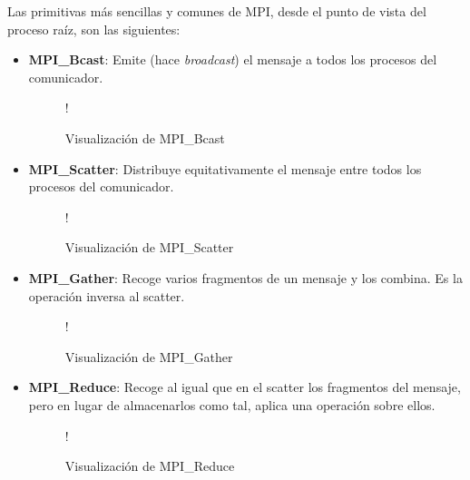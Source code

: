 Las primitivas más sencillas y comunes de MPI, desde el punto de vista del proceso raíz, son las siguientes:
\begin{itemize}
  \item \textbf{MPI\_Bcast}: Emite (hace \textit{broadcast}) el mensaje a todos los procesos del comunicador.
  
  \begin{figure}[H]
    \vspace*{0.5cm}
    \centering
     {!} {
    
    }
    \caption{Visualización de MPI\_Bcast \cite{cheung_mpi}}
    \label{fig:mpi_bcast}
  \end{figure}

  \item \textbf{MPI\_Scatter}: Distribuye equitativamente el mensaje entre todos los procesos del comunicador.

  \begin{figure}[H]
    \vspace*{0.5cm}
    \centering
     {!} {
    
    }
    \caption{Visualización de MPI\_Scatter \cite{cheung_mpi}}
    \label{fig:mpi_scatter}
  \end{figure}

  \item \textbf{MPI\_Gather}: Recoge varios fragmentos de un mensaje y los combina. Es la operación inversa al scatter.

  \begin{figure}[H]
    \vspace*{0.5cm}
    \centering
     {!} {
    
    }
    \caption{Visualización de MPI\_Gather \cite{cheung_mpi}}
    \label{fig:mpi_gather}
  \end{figure}

  \item \textbf{MPI\_Reduce}: Recoge al igual que en el scatter los fragmentos del mensaje, pero en lugar de almacenarlos como tal, aplica una operación sobre ellos.

  \begin{figure}[H]
    \vspace*{0.5cm}
    \centering
     {!} {
    
    }
    \caption{Visualización de MPI\_Reduce \cite{cheung_mpi}}
    \label{fig:mpi_reduce}
  \end{figure}

\end{itemize}



